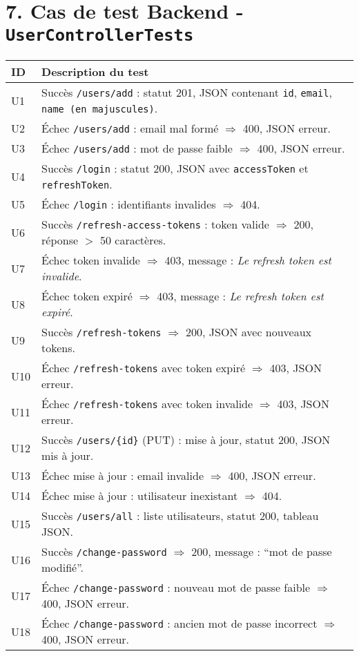 \documentclass[a4paper,12pt]{article}
\begin{document}
\section*{7. Cas de test Backend - \texttt{UserControllerTests}}
\begin{longtable}{|p{}|p{}|}
\hline
\textbf{ID} & \textbf{Description du test} \\
\hline
U1 & Succès \texttt{/users/add} : statut 201, JSON contenant \texttt{id}, \texttt{email}, \texttt{name (en majuscules)}. \\
\hline
U2 & Échec \texttt{/users/add} : email mal formé $\Rightarrow$ 400, JSON erreur. \\
\hline
U3 & Échec \texttt{/users/add} : mot de passe faible $\Rightarrow$ 400, JSON erreur. \\
\hline
U4 & Succès \texttt{/login} : statut 200, JSON avec \texttt{accessToken} et \texttt{refreshToken}. \\
\hline
U5 & Échec \texttt{/login} : identifiants invalides $\Rightarrow$ 404. \\
\hline
U6 & Succès \texttt{/refresh-access-tokens} : token valide $\Rightarrow$ 200, réponse $>$ 50 caractères. \\
\hline
U7 & Échec token invalide $\Rightarrow$ 403, message : \textit{Le refresh token est invalide}. \\
\hline
U8 & Échec token expiré $\Rightarrow$ 403, message : \textit{Le refresh token est expiré}. \\
\hline
U9 & Succès \texttt{/refresh-tokens} $\Rightarrow$ 200, JSON avec nouveaux tokens. \\
\hline
U10 & Échec \texttt{/refresh-tokens} avec token expiré $\Rightarrow$ 403, JSON erreur. \\
\hline
U11 & Échec \texttt{/refresh-tokens} avec token invalide $\Rightarrow$ 403, JSON erreur. \\
\hline
U12 & Succès \texttt{/users/\{id\}} (PUT) : mise à jour, statut 200, JSON mis à jour. \\
\hline
U13 & Échec mise à jour : email invalide $\Rightarrow$ 400, JSON erreur. \\
\hline
U14 & Échec mise à jour : utilisateur inexistant $\Rightarrow$ 404. \\
\hline
U15 & Succès \texttt{/users/all} : liste utilisateurs, statut 200, tableau JSON. \\
\hline
U16 & Succès \texttt{/change-password} $\Rightarrow$ 200, message : ``mot de passe modifié''. \\
\hline
U17 & Échec \texttt{/change-password} : nouveau mot de passe faible $\Rightarrow$ 400, JSON erreur. \\
\hline
U18 & Échec \texttt{/change-password} : ancien mot de passe incorrect $\Rightarrow$ 400, JSON erreur. \\
\hline
\end{longtable}
\end{document}
